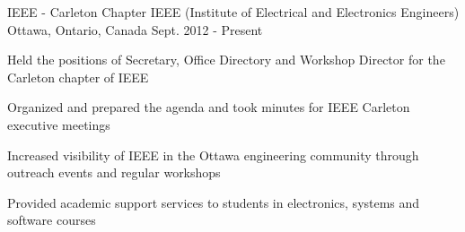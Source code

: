 

\begin{cventries}

  \cventry
    {IEEE - Carleton Chapter} %
    {IEEE (Institute of Electrical and Electronics Engineers)} %
    {Ottawa, Ontario, Canada} %
    {Sept. 2012 - Present} %
    {
      \begin{cvitems} %
        \item {Held the positions of Secretary, Office Directory and Workshop Director for the Carleton chapter of IEEE}
        \item {Organized and prepared the agenda and took minutes for IEEE Carleton executive meetings}
        \item {Increased visibility of IEEE in the Ottawa engineering community through outreach events and regular workshops}
        \item {Provided academic support services to students in electronics, systems and software courses}
      \end{cvitems}
    }

\end{cventries}

